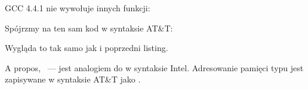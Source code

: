 
GCC 4.4.1 nie wywołuje innych funkcji:




Spójrzmy na ten sam kod w syntaksie AT\&T:



\myindex{\ATTSyntax}
Wygląda to tak samo jak i poprzedni listing.

A propos, ~--- jest analogiem do  w syntaksie Intel.
Adresowanie pamięci typu  jest zapisywane w syntaksie AT\&T jako .


